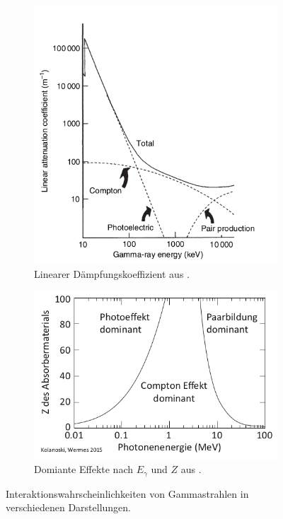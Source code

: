 \begin{figure}
	\centering
	\begin{subfigure}{.5\textwidth}
		\centering
		\includegraphics[width=0.9\linewidth]{./Bilder/E_mu_Gilmore.png}%
		\caption{Linearer Dämpfungskoeffizient aus \cite{book:gil}.}\label{fig:mu}
	\end{subfigure}%
	\begin{subfigure}{.5\textwidth}
		\centering
		\includegraphics[width=0.9\linewidth]{./Bilder/E_Z_Kolanoski.png}
		\caption{Domiante Effekte nach $E_\gamma$ und $Z$ aus \cite{book:kolano}.}\label{fig:z}
	\end{subfigure}
	\caption{Interaktionswahrscheinlichkeiten von Gammastrahlen in verschiedenen Darstellungen.}\label{}
\end{figure}





